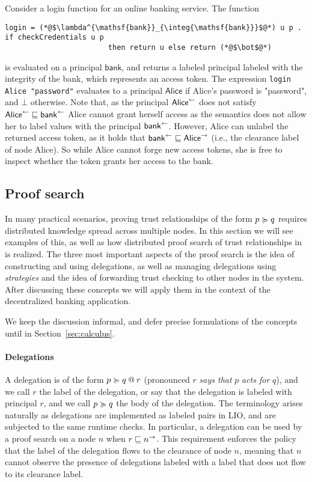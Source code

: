 Consider a login function for an online banking service. The function
\begin{lstlisting}
login = (*@$\lambda^{\mathsf{bank}}_{\integ{\mathsf{bank}}}$@*) u p . if checkCredentials u p
                        then return u else return (*@$\bot$@*)
\end{lstlisting}
is evaluated on a principal $\mathsf{bank}$, and returns a labeled principal labeled with the integrity of the bank, which represents an access token. The expression \lstinline[mathescape]!login Alice "password"! evaluates to a principal $\mathsf{Alice}$ if Alice's password is "password", and $\bot$ otherwise. Note that, as the principal $\integ{\mathsf{Alice}}$ does not satisfy $\integ{\mathsf{Alice}} \flowsto \integ{\mathsf{bank}}$ Alice cannot grant herself access as the semantics does not allow her to label values with the principal $\integ{\mathsf{bank}}$.
However, Alice can unlabel the returned access token, as it holds that $\integ{\mathsf{bank}} \flowsto \conf{\mathsf{Alice}}$ (i.e., the clearance label of node Alice). So while Alice cannot forge new access tokens, she is free to inspect whether the token grants her access to the bank.

\subsection{Proof search}
In many practical scenarios, proving trust relationships of the form $p \actsfor q$ requires distributed knowledge spread across multiple nodes. In this section we will see examples of this, as well as how distributed proof search of trust relationships in \lang{} is realized. The three most important aspects of the proof search is the idea of constructing and using delegations, as well as managing delegations using \emph{strategies} and the idea of forwarding trust checking to other nodes in the system. After discussing these concepts we will apply them in the context of the decentralized banking application.

We keep the discussion informal, and defer precise formulations of the concepts until in Section~\ref{sec:calculus}.

\paragraph{Delegations}
A delegation is of the form $\lb{r}{p \actsfor q}$ (pronounced $r$ \emph{says that} $p$ \emph{acts for} $q$), and we call $r$ the label of the delegation, or say that the delegation is labeled with principal $r$, and we call $p \actsfor q$ the body of the delegation. The terminology arises naturally as delegations are implemented as labeled pairs in LIO, and are subjected to the same runtime checks. In particular, a delegation can be used by a proof search on a node $n$ when $r \flowsto \conf{n}$. This requirement enforces the policy that the label of the delegation flows to the clearance of node $n$, meaning that $n$ cannot observe the presence of delegations labeled with a label that does not flow to its clearance label.


